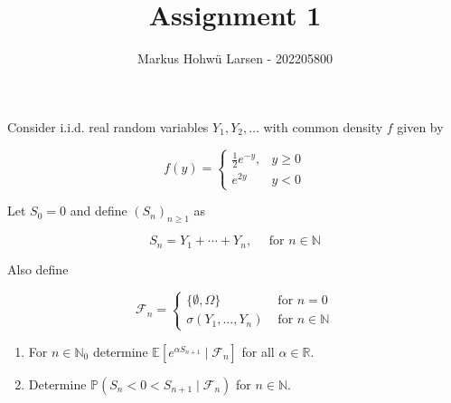 \documentclass{Class}
\author{Markus Hohwü Larsen - 202205800}
\title{Assignment 1}
\begin{document}
Consider i.i.d. real random variables $Y_1, Y_2, \ldots$ with common density $f$ given by

$$
f(y)= \begin{cases}\frac{1}{2} e^{-y}, & y \geq 0 \\ e^{2 y} & y<0\end{cases}
$$


Let $S_0=0$ and define $\left(S_n\right)_{n \geq 1}$ as

$$
S_n=Y_1+\cdots+Y_n, \quad \text { for } n \in \mathbb{N}
$$


Also define

$$
\mathcal{F}_n= \begin{cases}\{\emptyset, \Omega\} & \text { for } n=0 \\ \sigma\left(Y_1, \ldots, Y_n\right) & \text { for } n \in \mathbb{N}\end{cases}
$$
\begin{enumerate}
    \item For $n \in \mathbb{N}_0$ determine $\mathbb{E}\left[e^{\alpha S_{n+1}} \mid \mathcal{F}_n\right]$ for all $\alpha \in \mathbb{R}$.
    \item Determine $\mathbb{P}\left(S_n<0<S_{n+1} \mid \mathcal{F}_n\right)$ for $n \in \mathbb{N}$.
\end{enumerate}
\solution
\end{document}

